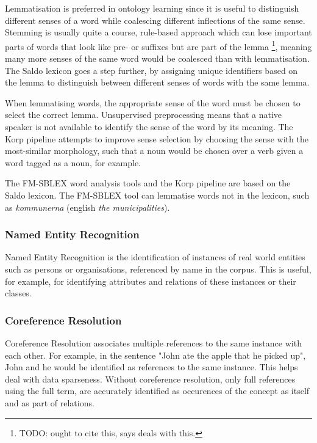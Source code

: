 \documentclass[a4paper]{report}
\newcommand{\todo}[1]{\footnote{{\color{red} TODO: #1}}}
\begin{document}
Lemmatisation is preferred in ontology learning since it is useful to distinguish different senses of a word while coalescing different inflections of the same sense.
Stemming is usually quite a course, rule-based approach which can lose important parts of words that look like pre- or suffixes but are part of the lemma \todo{ought to cite this, \citep{Gacitua08OntoLancs} says \citep{Alkula01MeaningWords} deals with this.}, meaning many more senses of the same word would be coalesced than with lemmatisation.
The Saldo lexicon \cite{Borin09Saldo} goes a step further, by assigning unique identifiers based on the lemma to distinguish between different senses of words with the same lemma.

When lemmatising words, the appropriate sense of the word must be chosen to select the correct lemma.
Unsupervised preprocessing means that a native speaker is not available to identify the sense of the word by its meaning.
The Korp pipeline attempts to improve sense selection by choosing the sense with the most-similar morphology, such that a noun would be chosen over a verb given a word tagged as a noun, for example.

The FM-SBLEX word analysis tools and the Korp pipeline are based on the Saldo lexicon.
The FM-SBLEX tool can lemmatise words not in the lexicon, such as \emph{kommunerna} (english \emph{the municipalities}).


\subsubsection{Named Entity Recognition}

Named Entity Recognition is the identification of instances of real world entities such as persons or organisations, referenced by name in the corpus.
This is useful, for example, for identifying attributes and relations of these instances or their classes.

\subsubsection{Coreference Resolution}

Coreference Resolution associates multiple references to the same instance with each other.
For example, in the sentence "John ate the apple that he picked up", John and he would be identified as references to the same instance.
This helps deal with data sparseness.
Without coreference resolution, only full references using the full term, are accurately identified as occurences of the concept as itself and as part of relations.
\end{document}
